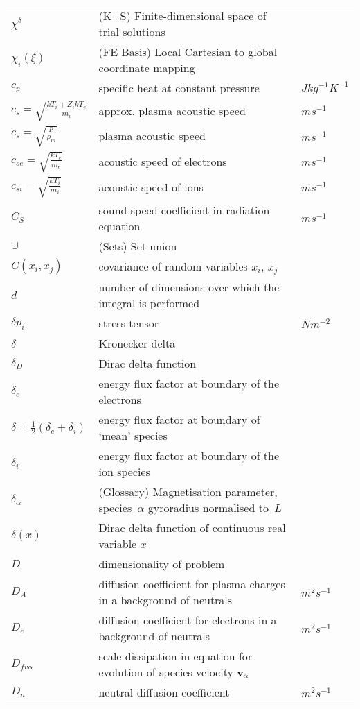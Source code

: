 \begin{longtable}{|p{3.0cm}|p{10.0cm}|p{3.0cm}|}
$\chi^{\delta}$ &  (K+S) Finite-dimensional space of trial solutions & \\
$\chi_i(\xi)$ &  (FE Basis) Local Cartesian to global coordinate mapping & \\
$c_p$ & specific heat at constant pressure  &  $J kg^{-1} K^{-1}$ \\
$c_s = \sqrt{\frac{kT_i + {Z_i} kT_e}{{m_i}}}$ & approx. plasma acoustic speed  &  $m s^{-1}$ \\
$c_s = \sqrt{\frac{p}{\rho_m}}$ & plasma acoustic speed  &  $m s^{-1}$ \\
$c_{se} = \sqrt{\frac{kT_e}{{m_e}}}$ & acoustic speed of electrons  &  $m s^{-1}$ \\
$c_{si} = \sqrt{\frac{kT_i}{{m_i}}}$ & acoustic speed of ions  &  $m s^{-1}$ \\
$C_S$ & sound speed coefficient in radiation equation  &  $m s^{-1}$ \\
$\cup$ &  (Sets) Set union & \\
$C(x_i, x_j)$ & covariance of random variables $x_i$, $x_j$  & \\
$d$ & number of dimensions over which the integral is performed  & \\
$\delta p_i$ & stress tensor  & $N m^{-2}$ \\
$\delta$ & Kronecker delta & \\
$\delta_D$ & Dirac delta function & \\
$\delta_e$ & energy flux factor at boundary of the electrons  & \\
$\delta=\frac{1}{2}(\delta_e+\delta_i)$ & energy flux factor at boundary of `mean' species  & \\
$\delta_i$ & energy flux factor at boundary of the ion species  & \\
$\delta_\alpha$ & (Glossary) Magnetisation  parameter, species~$\alpha$  gyroradius normalised to~$L$ & \\
$\delta(x)$ & Dirac delta function of continuous real variable $x$  & \\
$D$ & dimensionality of problem &   \\
$D_A$ & diffusion coefficient for plasma charges in a background of neutrals  &  $m^2 s^{-1}$ \\
$D_e$ & diffusion coefficient for electrons in a background of neutrals  &  $m^2 s^{-1}$ \\
$D_{fv\alpha}$ & scale dissipation in  equation for evolution of species velocity ${\bf v}_\alpha$ & \\
$D_n$ & neutral diffusion coefficient  &  $m^2 s^{-1}$ \\

\end{longtable}
